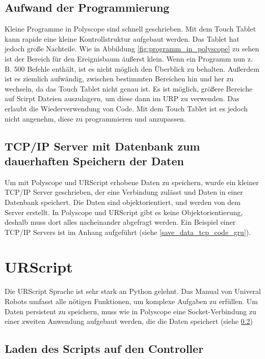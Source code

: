 \subsection{Aufwand der Programmierung}
\label{polyscope_aufwand}

Kleine Programme in Polyscope sind schnell geschrieben. Mit dem Touch Tablet kann rapide eine kleine Kontrollstruktur aufgebaut werden. Das Tablet hat jedoch große Nachteile. Wie in Abbildung \ref{fig:programm_in_polyscope} zu sehen ist der Bereich für den Ereignisbaum äußerst klein. Wenn ein Programm nun z. B. 500 Befehle enthält, ist es nicht möglich den Überblick zu behalten. Außerdem ist es ziemlich aufwändig, zwischen bestimmten Bereichen hin und her zu wechseln, da das Touch Tablet nicht genau ist. Es ist möglich, größere Bereiche auf Scirpt Dateien auszulagern, um diese dann im \ac{URP} zu verwenden. Das erlaubt die Wiederverwendung von Code. Mit dem Touch Tablet ist es jedoch nicht angenehm, diese zu programmieren und anzupassen.

\subsection{\ac{TCP/IP} Server mit Datenbank zum dauerhaften Speichern der Daten}
\label{tcp_datentank_sicherung_rel}

Um mit Polyscope und URScript erhobene Daten zu speichern, wurde ein kleiner \ac{TCP/IP} Server geschrieben, der eine Verbindung zulässt und Daten in einer Datenbank speichert. Die Daten sind objektorientiert, und werden von dem Server erstellt.
In Polyscope und URScript gibt es keine Objektorientierung, deshalb muss dort alles nacheinander abgefragt werden.
Ein Beispiel einer \ac{TCP/IP} Servers ist im Anhang aufgeführt (siehe \ref{save_data_tcp_code_gru}).

\section{URScript}
\label{sec:ur_script_rel}

Die URScript Sprache ist sehr stark an Python gelehnt.
Das Manual von Univeral Robots umfasst alle nötigen Funktionen, um komplexe Aufgaben zu erfüllen.
Um Daten persistent zu speichern, muss wie in Polyscope eine Socket-Verbindung zu einer zweiten Anwendung aufgebaut werden, die die Daten speichert (siehe \ref{tcp_datentank_sicherung_rel})

\subsection{Laden des Scripts auf den Controller}
\label{load_script_rel}

